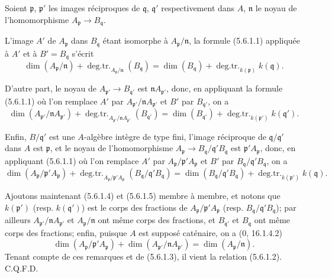 
Soient $\mathfrak p$, $\mathfrak p'$ les images réciproques de
$\mathfrak q$, $\mathfrak q'$ respectivement dans $A$, $\mathfrak n$ le
noyau de l'homomorphisme $A_{\mathfrak p}\to B_{\mathfrak q}$.

L'image $A'$ de $A_{\mathfrak p}$ dans $B_{\mathfrak q}$ étant isomorphe à
$A_{\mathfrak p}/\mathfrak n$, la formule (5.6.1.1) appliquée à $A'$ et à
$B'=B_{\mathfrak q}$ s'écrit
\begin{equation}
\dim(A_{\mathfrak p}/\mathfrak n)
+\operatorname{deg.tr.}_{A_{\mathfrak p}/\mathfrak n}(B_{\mathfrak q})
=\dim(B_{\mathfrak q})
+\operatorname{deg.tr.}_{k(\mathfrak p)}k(\mathfrak q).
\tag{5.6.1.3}\label{IV.2.s5.6.1.3-fr}
\end{equation}

D'autre part, le noyau de $A_{\mathfrak p'}\to B_{\mathfrak q'}$ est
$\mathfrak nA_{\mathfrak p'}$, donc, en appliquant la formule (5.6.1.1) où
l'on remplace $A'$ par $A_{\mathfrak p'}/\mathfrak nA_{\mathfrak p'}$ et
$B'$ par $B_{\mathfrak q'}$, on a
\begin{equation}
\dim(A_{\mathfrak p'}/\mathfrak nA_{\mathfrak p'})
+\operatorname{deg.tr.}_{A_{\mathfrak p'}/\mathfrak nA_{\mathfrak p'}}
(B_{\mathfrak q'})
=\dim(B_{\mathfrak q'})
+\operatorname{deg.tr.}_{k(\mathfrak p')}k(\mathfrak q').
\tag{5.6.1.4}\label{IV.2.s5.6.1.4-fr}
\end{equation}

Enfin, $B/\mathfrak q'$ est une $A$-algèbre intègre de type fini, l'image
réciproque de $\mathfrak q/\mathfrak q'$ dans $A$ est $\mathfrak p$, et le
noyau de l'homomorphisme
$A_{\mathfrak p}\to B_{\mathfrak q}/\mathfrak q'B_{\mathfrak q}$ est
$\mathfrak p'A_{\mathfrak p}$, donc, en appliquant (5.6.1.1) où l'on
remplace $A'$ par $A_{\mathfrak p}/\mathfrak p'A_{\mathfrak p}$ et $B'$ par
$B_{\mathfrak q}/\mathfrak q'B_{\mathfrak q}$, on a
\begin{equation}
\dim(A_{\mathfrak p}/\mathfrak p'A_{\mathfrak p})
+\operatorname{deg.tr.}_{A_{\mathfrak p}/\mathfrak p'A_{\mathfrak p}}
(B_{\mathfrak q}/\mathfrak q'B_{\mathfrak q})
=\dim(B_{\mathfrak q}/\mathfrak q'B_{\mathfrak q})
+\operatorname{deg.tr.}_{k(\mathfrak p')}k(\mathfrak q).
\tag{5.6.1.5}\label{IV.2.s5.6.1.5-fr}
\end{equation}

Ajoutons maintenant (5.6.1.4) et (5.6.1.5) membre à membre, et notons que
$k(\mathfrak p')$ (resp. $k(\mathfrak q')$) est le corps des fractions de
$A_{\mathfrak p}/\mathfrak p'A_{\mathfrak p}$ (resp.
$B_{\mathfrak q}/\mathfrak q'B_{\mathfrak q}$); par ailleurs
$A_{\mathfrak p'}/\mathfrak nA_{\mathfrak p'}$ et
$A_{\mathfrak p}/\mathfrak n$ ont même corps des fractions, et
$B_{\mathfrak q'}$ et $B_{\mathfrak q}$ ont même corps des fractions;
enfin, puisque $A$ est supposé caténaire, on a (0, 16.1.4.2)
\[
\dim(A_{\mathfrak p}/\mathfrak p'A_{\mathfrak p})
+\dim(A_{\mathfrak p'}/\mathfrak nA_{\mathfrak p'})
=\dim(A_{\mathfrak p}/\mathfrak n).
\]
Tenant compte de ces remarques et de (5.6.1.3), il vient la relation
(5.6.1.2). C.Q.F.D.

